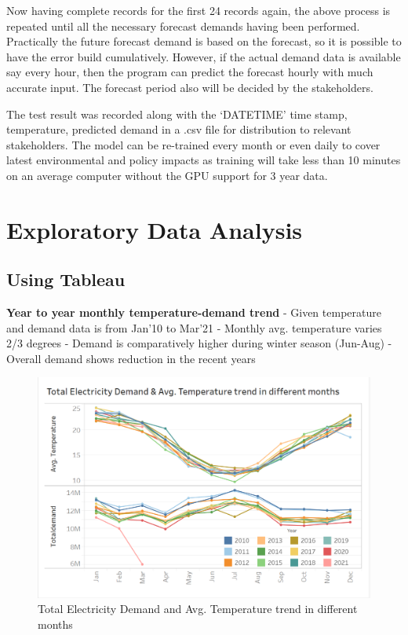 \documentclass[mstat,12pt]{unswthesis}
\begin{document}
\bigskip

Now having complete records for the first 24 records again, the above
process is repeated until all the necessary forecast demands having been
performed. Practically the future forecast demand is based on the
forecast, so it is possible to have the error build cumulatively.
However, if the actual demand data is available say every hour, then the
program can predict the forecast hourly with much accurate input. The
forecast period also will be decided by the stakeholders.

\bigskip

The test result was recorded along with the `DATETIME' time stamp,
temperature, predicted demand in a .csv file for distribution to
relevant stakeholders. The model can be re-trained every month or even
daily to cover latest environmental and policy impacts as training will
take less than 10 minutes on an average computer without the GPU support
for 3 year data.

\hypertarget{exploratory-data-analysis}{%
\chapter{Exploratory Data Analysis}\label{exploratory-data-analysis}}

\hypertarget{using-tableau}{%
\section{Using Tableau}\label{using-tableau}}

\textbf{Year to year monthly temperature-demand trend} \newline \newline
- Given temperature and demand data is from Jan'10 to Mar'21 \newline -
Monthly avg. temperature varies 2/3 degrees \newline - Demand is
comparatively higher during winter season (Jun-Aug) \newline - Overall
demand shows reduction in the recent years \newline

\begin{figure}[H]
\includegraphics{snapshots1/Slide 2 snapshot.png}
\caption{Total Electricity Demand and Avg. Temperature trend in different months}\label{4.1}
\end{figure}
\end{document}
